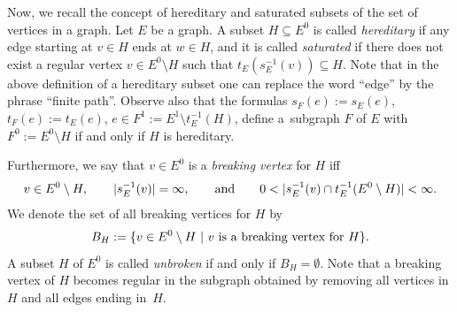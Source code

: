 \documentclass[12pt,times,a4paper]{amsart}
\numberwithin{equation}{section}
\def\text{\hbox}
\numberwithin{equation}{section}
\begin{document}
Now, we recall the concept of hereditary and saturated subsets of the set of vertices in a graph. Let $E$ be a graph. A subset 
$H\subseteq E^0$ is called {\em hereditary}
if any edge starting at $v\in H$ ends at $w\in H$, and it is called {\em saturated} if there does not exist a 
regular vertex $v\in E^0\setminus H$ such that 
$t_E(s_E^{-1}(v))\subseteq H$. 
Note that in the above definition of a hereditary subset one can replace the word 
``edge'' by the phrase ``finite path''. Observe also that the formulas $s_F(e):=s_E(e)$, $t_F(e):=t_E(e)$, 
$e\in F^1:=E^1\setminus t_E^{-1}(H)$,
define a~subgraph $F$ of $E$ with $F^0:=E^0\setminus H$ if and only if $H$ is hereditary.

Furthermore, we say that $v\in E^0$ is a {\em breaking vertex} for $H$ iff
\begin{equation}
v\in E^0\setminus H,\qquad |s^{-1}_E(v)|=\infty,\qquad\text{and}\qquad 0<|s^{-1}_E(v)\cap t^{-1}_E(E^0\setminus H)|<\infty.
\end{equation}
We denote the set of all breaking vertices for $H$ by
\begin{equation}
B_H:=\{v\in E^0\setminus H~|~v\text{ is a breaking vertex for }H\}.
\end{equation}
A subset $H$ of $E^0$ is called \emph{unbroken} if and only if $B_H=\emptyset$. Note that a breaking vertex of $H$ becomes 
regular in the subgraph obtained by removing all vertices
in $H$ and all edges ending in~$H$.
\end{document}
